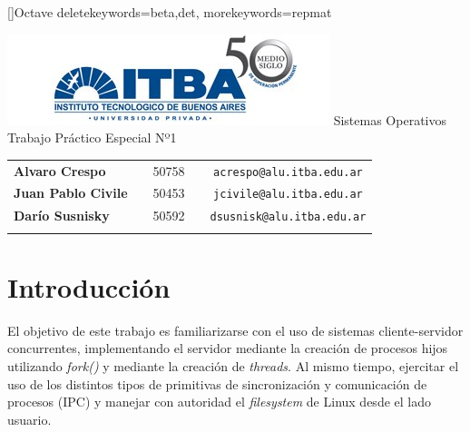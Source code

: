 \documentclass[a4paper,10pt]{article}
\begin{document}
\renewcommand{\lstlistingname}{C\'odigo Fuente}
[]{Octave}{
	deletekeywords={beta,det},
	morekeywords={repmat}
} 
\begin{titlepage}
        \thispagestyle{empty}
        \begin{center}
                \includegraphics{./images/itba.jpg}
                \vfill
                \Huge{Sistemas Operativos}\\
                \vspace{1cm}
                \huge{Trabajo Práctico Especial Nº1}\\
        \end{center}
        \vspace{2cm}
        \large{
                \begin{tabular}{lcrc}
                        \textbf{Alvaro Crespo} & & 50758 & \ \ \texttt{acrespo@alu.itba.edu.ar}\\
                        \textbf{Juan Pablo Civile} & & 50453 & \ \ \texttt{jcivile@alu.itba.edu.ar}\\
                        \textbf{Darío Susnisky} & & 50592 & \ \ \texttt{dsusnisk@alu.itba.edu.ar}\\
                        \\ 
                \end{tabular}
        }
        \vfill
\end{titlepage}

\setcounter{page}{1}

\tableofcontents
\newpage
\section{Introducción}
El objetivo de este trabajo es familiarizarse con el uso de sistemas cliente-servidor concurrentes, implementando el servidor mediante la creación de procesos hijos 
utilizando \textit{fork()} y mediante la creación de \textit{threads}. Al mismo tiempo, ejercitar el uso de los distintos tipos de primitivas de sincronización y 
comunicación de procesos (IPC) y manejar con autoridad el \textit{filesystem} de Linux desde el lado usuario.
\end{document}

